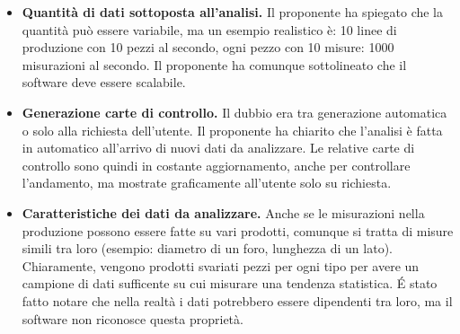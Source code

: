 \documentclass[a4paper,12pt]{article}
\begin{document}
\begin{itemize}

\item \textbf{Quantità di dati sottoposta all'analisi.} Il proponente ha spiegato che la quantità può essere variabile, ma un esempio realistico è: 10 linee di produzione con 10 pezzi al secondo, ogni pezzo con 10 misure: 1000 misurazioni al secondo. Il proponente ha comunque sottolineato che il software deve essere scalabile.

\item \textbf{Generazione carte di controllo.} Il dubbio era tra generazione automatica o solo alla richiesta dell'utente. Il proponente ha chiarito che l'analisi è fatta in automatico all'arrivo di nuovi dati da analizzare. Le relative carte di controllo sono quindi in costante aggiornamento, anche per controllare l'andamento, ma mostrate graficamente all'utente solo su richiesta.

\item \textbf{Caratteristiche dei dati da analizzare.} Anche se le misurazioni nella produzione possono essere fatte su vari prodotti, comunque si tratta di misure simili tra loro (esempio: diametro di un foro, lunghezza di un lato). Chiaramente, vengono prodotti svariati pezzi per ogni tipo per avere un campione di dati sufficente su cui misurare una tendenza statistica. É stato fatto notare che nella realtà i dati potrebbero essere dipendenti tra loro, ma il software non riconosce questa proprietà.

\end{itemize}
\end{document}
